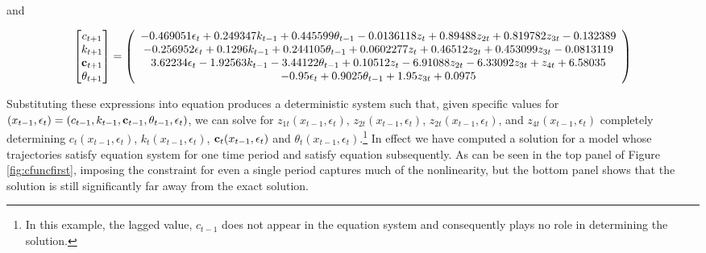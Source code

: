 \documentclass[12pt]{article}
\begin{document}
and 


{\tiny
\begin{gather*}
  \begin{bmatrix}
c_{t+1}\\k_{t+1}\\ \rcpC_{t+1}\\\theta_{t+1}
  \end{bmatrix}=%
  \left(
   \begin{array}{c}
    -0.469051 \epsilon _t+0.249347 k_{t-1}+0.445599 \theta _{t-1}-0.0136118
      z_t+0.89488 z_{2 t}+0.819782 z_{3 t}-0.132389 \\
    -0.256952 \epsilon _t+0.1296 k_{t-1}+0.244105 \theta _{t-1}+0.0602277
      z_t+0.46512 z_{2 t}+0.453099 z_{3 t}-0.0813119 \\
    3.62234 \epsilon _t-1.92563 k_{t-1}-3.44122 \theta _{t-1}+0.10512
      z_t-6.91088 z_{2 t}-6.33092 z_{3 t}+z_{4 t}+6.58035 \\
    -0.95 \epsilon _t+0.9025 \theta _{t-1}+1.95 z_{3 t}+0.0975 \\
   \end{array}
   \right)
\end{gather*}}

Substituting  these expressions into equation  produces
a deterministic system such that, given specific values for 
$(x_{t-1},\epsilon_{t})=(c_{t-1}, k_{t-1},{\mathbf{c}}_{t-1}, \theta_{t-1}, \epsilon_t)$, we can solve for $z_{1t}(x_{t-1},\epsilon_{t})$, $z_{2t}(x_{t-1},\epsilon_{t})$, $z_{2t}(x_{t-1},\epsilon_{t})$, and $z_{4t}(x_{t-1},\epsilon_{t})$  completely determining
$c_{t}(x_{t-1},\epsilon_{t})$, $k_{t}(x_{t-1},\epsilon_{t})$, ${\mathbf{c}}_{t}(x_{t-1},\epsilon_{t})$  and $\theta_{t}(x_{t-1},\epsilon_{t})$.\footnote{In this example, the lagged value,  $c_{t-1}$ does not appear in the equation system and consequently plays no role in determining the solution.}  In effect we have 
computed a solution for a model whose trajectories satisfy equation system 
for one time period and satisfy equation  subsequently. As can
be seen in the top panel of Figure \ref{fig:cfuncfirst}, 
imposing the constraint for even a single period captures much of the nonlinearity, but the bottom panel shows that the solution is 
still significantly far away from the exact solution.
\end{document}
